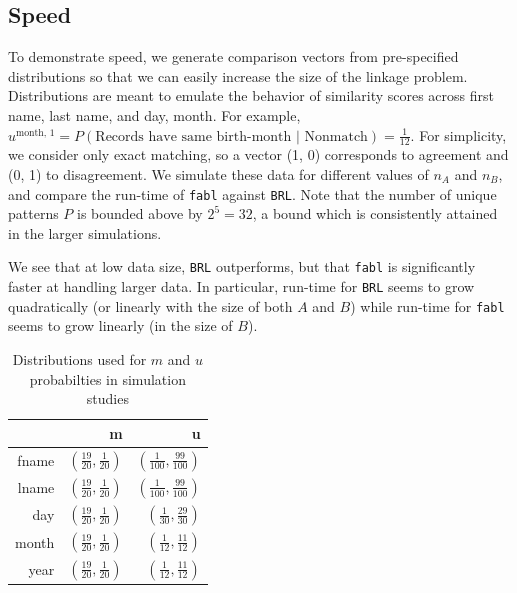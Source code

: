 \documentclass[12pt,letterpaper]{article}
\newcommand{\1}[1]{\mathbb{I}\!\left[#1\right]} %
\begin{document}
\hypertarget{speed}{%
	\subsection{Speed}\label{speed}}

To demonstrate speed, we generate comparison vectors from pre-specified
distributions so that we can easily increase the size of the linkage
problem. Distributions are meant to emulate the behavior of similarity
scores across first name, last name, and day, month. For example, $u^{\text{month, 1}} = P(\text{Records have same birth-month | Nonmatch}) = \frac{1}{12}$. For simplicity, we
consider only exact matching, so a vector (1, 0) corresponds to
agreement and (0, 1) to disagreement. We simulate these data for
different values of \(n_A\) and \(n_B\), and compare the run-time of
\texttt{fabl} against \texttt{BRL}. Note that the number of unique
patterns \(P\) is bounded above by \(2^5 = 32\), a bound which is
consistently attained in the larger simulations.

We see that at low data size, \texttt{BRL} outperforms, but that
\texttt{fabl} is significantly faster at handling larger data. In
particular, run-time for \texttt{BRL} seems to grow quadratically (or
linearly with the size of both \(A\) and \(B\)) while run-time for
\texttt{fabl} seems to grow linearly (in the size of \(B\)).

\begin{table}[t]
	\centering
	\begin{tabular}{rrr}
		\hline
		& m & u \\ 
		\hline
		fname & $\left(\frac{19}{20}, \frac{1}{20}\right)$ & $\left(\frac{1}{100}, \frac{99}{100}\right)$ \\ 
		lname & $\left(\frac{19}{20}, \frac{1}{20}\right)$ & $\left(\frac{1}{100}, \frac{99}{100}\right)$ \\ 
		day & $\left(\frac{19}{20}, \frac{1}{20}\right)$ & $\left(\frac{1}{30}, \frac{29}{30}\right)$ \\ 
		month & $\left(\frac{19}{20}, \frac{1}{20}\right)$ & $\left(\frac{1}{12}, \frac{11}{12}\right)$ \\ 
		year & $\left(\frac{19}{20}, \frac{1}{20}\right)$ & $\left(\frac{1}{12}, \frac{11}{12}\right)$ \\ 
		\hline
	\end{tabular}
\caption{Distributions used for $m$ and $u$ probabilties in simulation studies}\label{fig:distributions}
\end{table}
\end{document}
